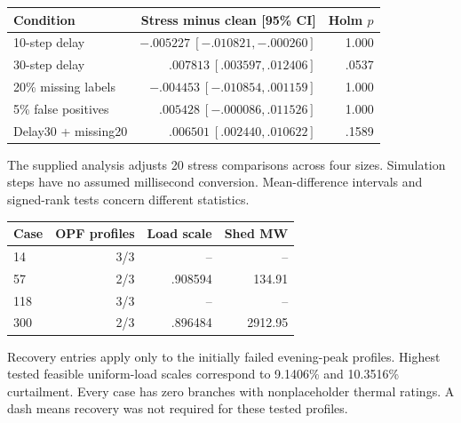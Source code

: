 \documentclass[10pt]{article}
\makeatletter
\newcommand{\tablefoot}[1]{\par\vspace{3pt}\begin{minipage}{\linewidth}\footnotesize #1\end{minipage}}
\newenvironment{exporttable}{\par\noindent\begin{minipage}{\linewidth}\def\@captype{table}}{\end{minipage}\par}
\makeatother
\begin{document}
\clearpage
\setcounter{table}{5}
\begin{exporttable}
\centering\scriptsize
\setlength{\tabcolsep}{3pt}
\caption{Selected paired observation effects for IEEE118. Positive differences mean worse PAS under the perturbed observation.}
\label{tab:observation}
\begin{tabular}{lrr}
\toprule
Condition & Stress minus clean [95\% CI] & Holm $p$\\
\midrule
10-step delay & $-.005227\ [-.010821,-.000260]$ & 1.000\\
30-step delay & $.007813\ [.003597,.012406]$ & .0537\\
20\% missing labels & $-.004453\ [-.010854,.001159]$ & 1.000\\
5\% false positives & $.005428\ [-.000086,.011526]$ & 1.000\\
Delay30 + missing20 & $.006501\ [.002440,.010622]$ & .1589\\
\bottomrule
\end{tabular}
\tablefoot{The supplied analysis adjusts 20 stress comparisons across four sizes. Simulation steps have no assumed millisecond conversion. Mean-difference intervals and signed-rank tests concern different statistics.}
\end{exporttable}
\clearpage
\setcounter{table}{6}
\begin{exporttable}
\centering\small
\caption{Corrective ACOPF scope and load-curtailment recovery.}
\label{tab:physical}
\begin{tabular}{lrrr}
\toprule
Case & OPF profiles & Load scale & Shed MW\\
\midrule
14 & 3/3 & -- & --\\
57 & 2/3 & .908594 & 134.91\\
118 & 3/3 & -- & --\\
300 & 2/3 & .896484 & 2912.95\\
\bottomrule
\end{tabular}
\tablefoot{Recovery entries apply only to the initially failed evening-peak profiles. Highest tested feasible uniform-load scales correspond to 9.1406\% and 10.3516\% curtailment. Every case has zero branches with nonplaceholder thermal ratings. A dash means recovery was not required for these tested profiles.}
\end{exporttable}
\clearpage
\setcounter{table}{7}
\end{document}
